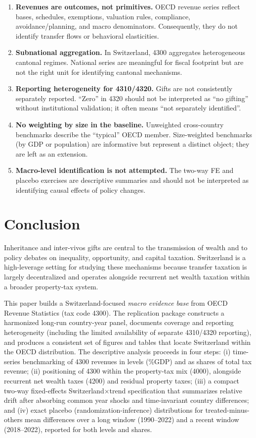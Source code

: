 \documentclass[11pt,a4paper]{article}
\begin{document}
\begin{enumerate}
  \item \textbf{Revenues are outcomes, not primitives.} OECD revenue series reflect bases, schedules, exemptions, valuation rules, compliance, avoidance/planning, and macro denominators. Consequently, they do not identify transfer flows or behavioral elasticities.
  \item \textbf{Subnational aggregation.} In Switzerland, 4300 aggregates heterogeneous cantonal regimes. National series are meaningful for fiscal footprint but are not the right unit for identifying cantonal mechanisms.
  \item \textbf{Reporting heterogeneity for 4310/4320.} Gifts are not consistently separately reported. ``Zero'' in 4320 should not be interpreted as ``no gifting'' without institutional validation; it often means ``not separately identified''.
  \item \textbf{No weighting by size in the baseline.} Unweighted cross-country benchmarks describe the ``typical'' OECD member. Size-weighted benchmarks (by GDP or population) are informative but represent a distinct object; they are left as an extension.
  \item \textbf{Macro-level identification is not attempted.} The two-way FE and placebo exercises are descriptive summaries and should not be interpreted as identifying causal effects of policy changes.
\end{enumerate}

\section{Conclusion}
Inheritance and inter-vivos gifts are central to the transmission of wealth and to policy debates on inequality, opportunity, and capital taxation. Switzerland is a high-leverage setting for studying these mechanisms because transfer taxation is largely decentralized and operates alongside recurrent net wealth taxation within a broader property-tax system.

This paper builds a Switzerland-focused \emph{macro evidence base} from OECD Revenue Statistics (tax code 4300). The replication package constructs a harmonized long-run country-year panel, documents coverage and reporting heterogeneity (including the limited availability of separate 4310/4320 reporting), and produces a consistent set of figures and tables that locate Switzerland within the OECD distribution. The descriptive analysis proceeds in four steps: (i) time-series benchmarking of 4300 revenues in levels (\%GDP) and as shares of total tax revenue; (ii) positioning of 4300 within the property-tax mix (4000), alongside recurrent net wealth taxes (4200) and residual property taxes; (iii) a compact two-way fixed-effects Switzerland$\times$trend specification that summarizes relative drift after absorbing common year shocks and time-invariant country differences; and (iv) exact placebo (randomization-inference) distributions for treated-minus-others mean differences over a long window (1990--2022) and a recent window (2018--2022), reported for both levels and shares.
\end{document}

